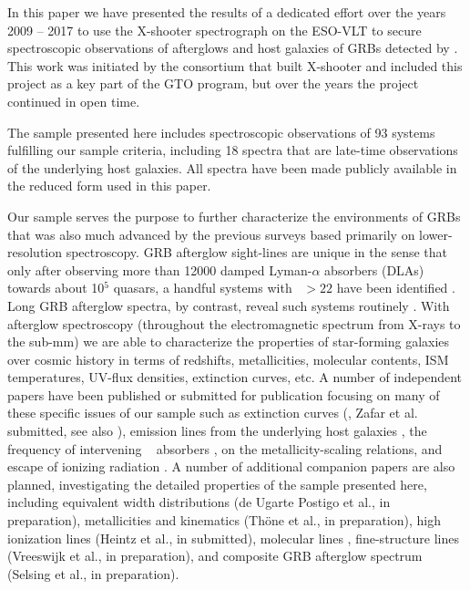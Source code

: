 \documentclass[longauth]{aa}    %
\begin{document}
In this paper we have presented the results of a dedicated effort over the years
2009 -- 2017 to use the X-shooter spectrograph on the ESO-VLT to secure
spectroscopic observations of afterglows and host galaxies of GRBs detected by
\swift. This work was initiated by the consortium that built X-shooter and
included this project as a key part of the GTO program, but over the years the
project continued in open time.

The sample presented here includes spectroscopic observations of 93 systems
fulfilling our sample criteria, including 18 spectra that are late-time
observations of the underlying host galaxies. All spectra have been made
publicly available in the reduced form used in this paper.

Our sample serves the purpose to further characterize the environments of GRBs
that was also much advanced by the previous surveys based primarily on
lower-resolution spectroscopy. GRB afterglow sight-lines are unique in the sense
that only after observing more than 12000 damped Lyman-$\alpha$ absorbers (DLAs)
towards about 10$^5$ quasars, a handful systems with \nh~$ > 22$ have been
identified \citep[e.g., five in][]{Noterdaeme2012b}. Long GRB afterglow spectra,
by contrast, reveal such systems routinely \citep[][and this
work]{Jakobsson2006b, Fynbo2009, Cucchiara2015}. With afterglow spectroscopy
(throughout the electromagnetic spectrum from X-rays to the sub-mm) we are able
to characterize the properties of star-forming galaxies over cosmic history in
terms of redshifts, metallicities, molecular contents, ISM temperatures, UV-flux
densities, extinction curves, etc.  A number of independent papers have been
published or submitted for publication focusing on many of these specific issues
of our sample such as extinction curves (\citealt{Japelj2015}, Zafar et al.
submitted, see also \citealt{Fynbo2014, Heintz2017a}), emission lines from the
underlying host galaxies \citep{Kruhler2015}, the frequency of intervening
\mgii~ absorbers \citep{Christensen2017}, \citet{Arabsalmani2018} on the
metallicity-scaling relations, and escape of ionizing radiation
\citep{Tanvir2017} . A number of additional companion papers are also planned,
investigating the detailed properties of the sample presented here, including
equivalent width distributions (de Ugarte Postigo et al., in preparation),
metallicities and kinematics (Th{\"o}ne et al., in preparation), high ionization
lines (Heintz et al., in submitted), molecular lines \citep{Bolmer2018},
fine-structure lines (Vreeswijk et al., in preparation), and composite GRB
afterglow spectrum (Selsing et al., in preparation).
\end{document}
